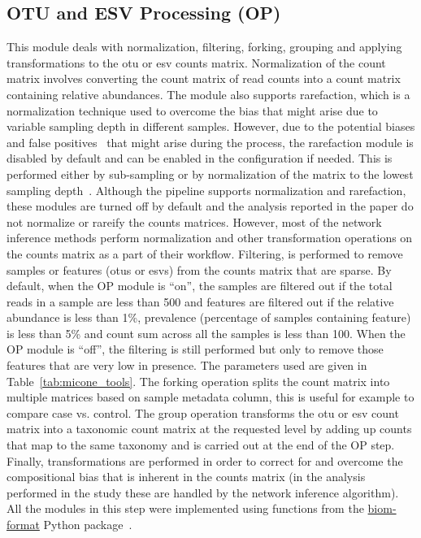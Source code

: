   \subsection*{OTU and ESV Processing (OP)}
  \vspace{-5mm}
  This module deals with normalization, filtering, forking, grouping and applying transformations to the \ac{otu} or \ac{esv} counts matrix.
  Normalization of the count matrix involves converting the count matrix of read counts into a count matrix containing relative abundances.
  The module also supports rarefaction, which is a normalization technique used to overcome the bias that might arise due to variable sampling depth in different samples.
  However, due to the potential biases and false positives~\cite{mcmurdieWasteNotWant2014,chaoCoveragebasedRarefactionExtrapolation2012} that might arise during the process, the rarefaction module is disabled by default and can be enabled in the configuration if needed.
  This is performed either by sub-sampling or by normalization of the matrix to the lowest sampling depth~\cite{Weiss2015}.
  Although the pipeline supports normalization and rarefaction, these modules are turned off by default and the analysis reported in the paper do not normalize or rareify the counts matrices.
  However, most of the network inference methods perform normalization and other transformation operations on the counts matrix as a part of their workflow.
  Filtering, is performed to remove samples or features (\ac{otu}s or \ac{esv}s) from the counts matrix that are sparse.
  By default, when the OP module is ``on'', the samples are filtered out if the total reads in a sample are less than 500 and features are filtered out if the relative abundance is less than 1\%, prevalence (percentage of samples containing feature) is less than 5\% and count sum across all the samples is less than 100.
  When the OP module is ``off'', the filtering is still performed but only to remove those features that are very low in presence.
  The parameters used are given in Table~\ref{tab:micone_tools}.
  The forking operation splits the count matrix into multiple matrices based on sample metadata column, this is useful for example to compare case vs. control.
  The group operation transforms the \ac{otu} or \ac{esv} count matrix into a taxonomic count matrix at the requested level by adding up counts that map to the same taxonomy and is carried out at the end of the OP step.
  Finally, transformations are performed in order to correct for and overcome the compositional bias that is inherent in the counts matrix (in the analysis performed in the study these are handled by the network inference algorithm).
  All the modules in this step were implemented using functions from the \href{http://biom-format.org/}{biom-format} Python package~\cite{mcdonaldBiologicalObservationMatrix2012}.

